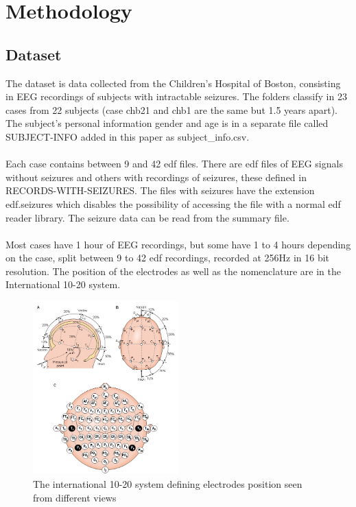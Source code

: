 \section{Methodology}
\subsection{Dataset}
The dataset is data collected from the Children’s Hospital of Boston, consisting in EEG recordings of subjects with intractable seizures. The folders classify in 23 cases from 22 subjects (case chb21 and chb1 are the same but 1.5 years apart). The subject’s personal information gender and age is in a separate file called SUBJECT-INFO added in this paper as subject\_info.csv.
\\\\
Each case contains between 9 and 42 edf files. There are edf files of EEG signals without seizures and others with recordings of seizures, these defined in RECORDS-WITH-SEIZURES. The files with seizures have the extension edf.seizures which disables the possibility of accessing the file with a normal edf reader library. The seizure data can be read from the summary file.
\\\\
Most cases have 1 hour of EEG recordings, but some have 1 to 4 hours depending on the case, split between 9 to 42 edf recordings, recorded at 256Hz in 16 bit resolution. The position of the electrodes as well as the nomenclature are in the International 10-20 system.
\\
\begin{figure}[h!]
  \caption{The international 10-20 system defining electrodes position seen from different views}
  \centering
  \includegraphics[width=0.5\textwidth]{img/electrodesposiiton.png}
\end{figure}
